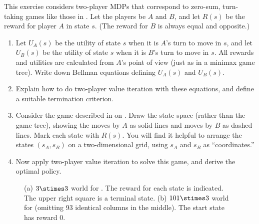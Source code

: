 \begin{exercise}
This exercise considers two-player MDPs that correspond to
zero-sum, turn-taking games like those in .
Let the players be \(A\) and \(B\), and let \(R(s)\) be the reward
for player \(A\) in state \(s\). (The reward for \(B\) is always equal and
opposite.)
\begin{enumerate}
\item Let \(U_A(s)\) be the utility of
state \(s\) when it is \(A\)'s turn to move in \(s\), and let \(U_B(s)\)
be the utility of
state \(s\) when it is \(B\)'s turn to move in \(s\). 
All rewards and utilities
are calculated from \(A\)'s point of view (just as in a minimax game tree).
Write down Bellman equations defining \(U_A(s)\) and \(U_B(s)\).

\item  Explain how to do two-player value iteration with these
equations, and define a suitable termination criterion.

\item Consider the game described in  on
. Draw the state space (rather than the game
tree), showing the moves
by \(A\) as solid lines and moves by \(B\) as dashed lines.
Mark each state with \(R(s)\). You will find it helpful to arrange the
states \((s_A,s_B)\) on a two-dimensional grid, using \(s_A\) and \(s_B\) as ``coordinates.''

\item Now apply two-player value iteration to solve this game, and
derive the optimal policy.
\end{enumerate}
\end{exercise} 

\begin{figure}[tbp]
\caption{(a) \(3\stimes 3\) world for \protect{}. The reward for each state is indicated. The upper right square is a terminal state. (b) \(101\stimes 3\) world for \protect{} (omitting 93 identical columns in the middle). 
The start state has reward 0.}
\label{grid-mdp-figure}
\end{figure} 

